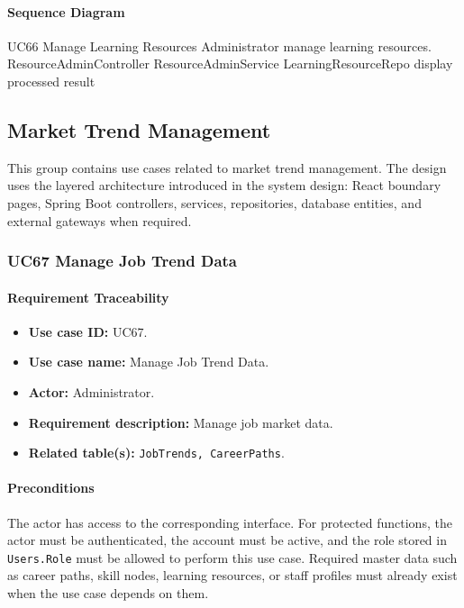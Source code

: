 \paragraph{Sequence Diagram}

\SequenceDiagram
{UC66 Manage Learning Resources}
{Administrator}
{manage learning resources.}
{ResourceAdminController}
{ResourceAdminService}
{LearningResourceRepo}
{display processed result}

\subsection{Market Trend Management}

This group contains use cases related to market trend management. The design uses the layered architecture introduced in the system design: React boundary pages, Spring Boot controllers, services, repositories, database entities, and external gateways when required.

\subsubsection{UC67 Manage Job Trend Data}

\paragraph{Requirement Traceability}

\begin{itemize}
    \item \textbf{Use case ID:} UC67.
    \item \textbf{Use case name:} Manage Job Trend Data.
    \item \textbf{Actor:} Administrator.
    \item \textbf{Requirement description:} Manage job market data.
    \item \textbf{Related table(s):} \texttt{JobTrends, CareerPaths}.
\end{itemize}

\paragraph{Preconditions}

The actor has access to the corresponding interface. For protected functions, the actor must be authenticated, the account must be active, and the role stored in \texttt{Users.Role} must be allowed to perform this use case. Required master data such as career paths, skill nodes, learning resources, or staff profiles must already exist when the use case depends on them.

